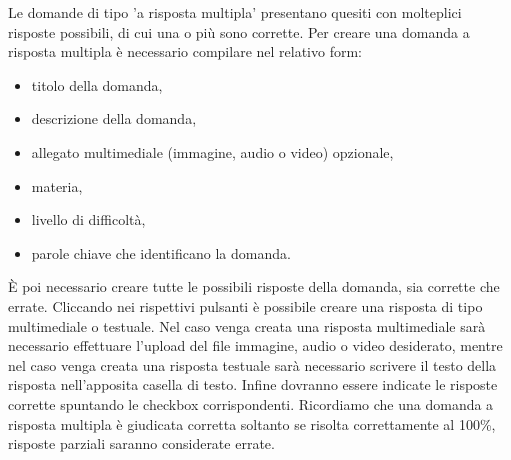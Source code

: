 \documentclass[a4paper, titlepage]{article}
\begin{document}
	 Le domande di tipo 'a risposta multipla' presentano quesiti con molteplici risposte possibili, di cui una o più sono corrette.
	 Per creare una domanda a risposta multipla è necessario compilare nel relativo form:
	 \begin{itemize}
	 	\item titolo della domanda,
	 	\item descrizione della domanda,
	 	\item allegato multimediale (immagine, audio o video) opzionale,
	 	\item materia,
	 	\item livello di difficoltà,
	 	\item parole chiave che identificano la domanda.
	 \end{itemize}
	 È poi necessario creare tutte le possibili risposte della domanda, sia corrette che errate. Cliccando nei rispettivi pulsanti è possibile creare una risposta di tipo multimediale o testuale. Nel caso venga creata una risposta multimediale sarà necessario effettuare l'upload del file immagine, audio o video desiderato, mentre nel caso venga creata una risposta testuale sarà necessario scrivere il testo della risposta nell'apposita casella di testo.
	 Infine dovranno essere indicate le risposte corrette spuntando le checkbox corrispondenti. Ricordiamo che una domanda a risposta multipla è giudicata corretta soltanto se risolta correttamente al 100\%, risposte parziali saranno considerate errate.
	 
	 \newpage
\end{document}
